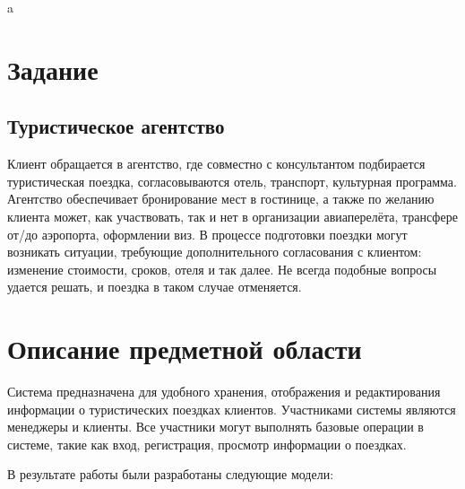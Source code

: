\documentclass[a4paper,12pt]{article}
\begin{document}
a
\newpage

\section{Задание}

\subsection{Туристическое агентство}

Клиент обращается в агентство, где совместно с консультантом подбирается туристическая поездка, согласовываются отель, транспорт, культурная программа. Агентство обеспечивает бронирование мест в гостинице, а также по желанию клиента может, как участвовать, так и нет в организации авиаперелёта, трансфере от/до аэропорта, оформлении виз. В процессе подготовки поездки могут возникать ситуации, требующие дополнительного согласования с клиентом: изменение стоимости, сроков, отеля и так далее. Не всегда подобные вопросы удается решать, и поездка в таком случае отменяется.

\section{Описание предметной области}

Система предназначена для удобного хранения, отображения и редактирования информации о туристических поездках клиентов. Участниками системы являются менеджеры и клиенты. Все участники могут выполнять базовые операции в системе, такие как вход, регистрация, просмотр информации о поездках.

В результате работы были разработаны следующие модели:
\end{document}
